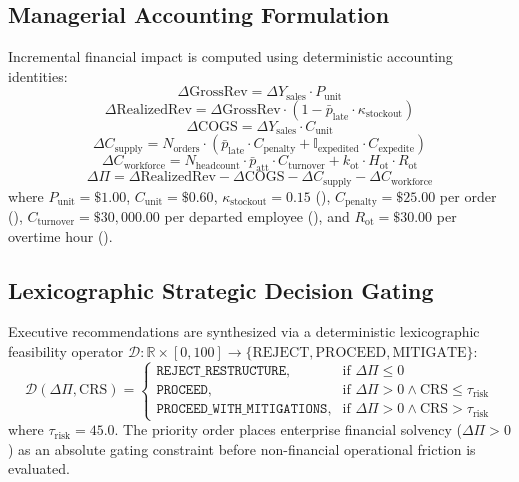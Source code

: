 \documentclass[journal]{IEEEtran}
\begin{document}
\subsection{Managerial Accounting Formulation}
Incremental financial impact is computed using deterministic accounting identities:
\begin{equation}
\Delta \text{GrossRev} = \Delta Y_{\text{sales}} \cdot P_{\text{unit}}
\end{equation}
\begin{equation}
\Delta \text{RealizedRev} = \Delta \text{GrossRev} \cdot (1 - \bar{p}_{\text{late}} \cdot \kappa_{\text{stockout}})
\end{equation}
\begin{equation}
\Delta \text{COGS} = \Delta Y_{\text{sales}} \cdot C_{\text{unit}}
\end{equation}
\begin{equation}
\Delta C_{\text{supply}} = N_{\text{orders}} \cdot \left( \bar{p}_{\text{late}} \cdot C_{\text{penalty}} + \mathbb{I}_{\text{expedited}} \cdot C_{\text{expedite}} \right)
\end{equation}
\begin{equation}
\Delta C_{\text{workforce}} = N_{\text{headcount}} \cdot \bar{p}_{\text{att}} \cdot C_{\text{turnover}} + k_{\text{ot}} \cdot H_{\text{ot}} \cdot R_{\text{ot}}
\end{equation}
\begin{equation}
\Delta \Pi = \Delta \text{RealizedRev} - \Delta \text{COGS} - \Delta C_{\text{supply}} - \Delta C_{\text{workforce}}
\end{equation}
where $P_{\text{unit}} = \$1.00$, $C_{\text{unit}} = \$0.60$, $\kappa_{\text{stockout}} = 0.15$ (), $C_{\text{penalty}} = \$25.00$ per order (), $C_{\text{turnover}} = \$30,000.00$ per departed employee (), and $R_{\text{ot}} = \$30.00$ per overtime hour ().

\subsection{Lexicographic Strategic Decision Gating}
Executive recommendations are synthesized via a deterministic lexicographic feasibility operator $\mathcal{D}: \mathbb{R} \times [0, 100] \rightarrow \{\text{REJECT}, \text{PROCEED}, \text{MITIGATE}\}$:
\begin{equation}
\mathcal{D}(\Delta \Pi, \text{CRS}) = \begin{cases}
\texttt{REJECT\_RESTRUCTURE}, & \text{if } \Delta \Pi \le 0 \\
\texttt{PROCEED}, & \text{if } \Delta \Pi > 0 \land \text{CRS} \le \tau_{\text{risk}} \\
\texttt{PROCEED\_WITH\_MITIGATIONS}, & \text{if } \Delta \Pi > 0 \land \text{CRS} > \tau_{\text{risk}}
\end{cases}
\end{equation}
where $\tau_{\text{risk}} = 45.0$. The priority order places enterprise financial solvency ($\Delta \Pi > 0$) as an absolute gating constraint before non-financial operational friction is evaluated.
\end{document}
